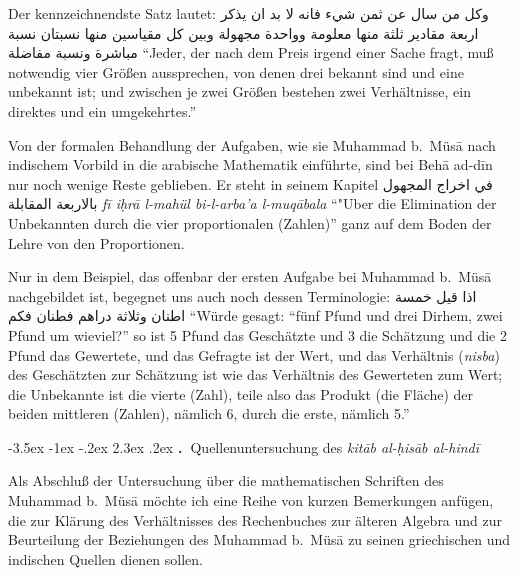 \documentclass[11pt,a4paper]{article}
\makeatletter
\newcommand{\RL}[1]{\beginR#1\endR}
\renewcommand{\section}{\@startsection{section}{1}{\z@}%
  {-3.5ex \@plus -1ex \@minus -.2ex}%
  {2.3ex \@plus .2ex}%
  {\normalfont\Large\bfseries\color{sectioncolor}\thesection.\ }}
\newcommand{\ar}[1]{{\arabicfont\RL{#1}}}
\newcommand{\enquote}[1]{``#1''}
\makeatother
\begin{document}
Der kennzeichnendste Satz lautet: \ar{وكل من سال عن ثمن شيء فانه لا بد ان يذكر اربعة مقادير ثلثة منها معلومة وواحدة مجهولة وبين كل مقياسين منها نسبتان نسبة مباشرة ونسبة مفاضلة} \enquote{Jeder, der nach dem Preis irgend einer Sache fragt, mu\ss{} notwendig vier Gr\"o\ss{}en aussprechen, von denen drei bekannt sind und eine unbekannt ist; und zwischen je zwei Gr\"o\ss{}en bestehen zwei Verh\"altnisse, ein direktes und ein umgekehrtes.}

Von der formalen Behandlung der Aufgaben, wie sie Muhammad b.\ M\"us\=a nach indischem Vorbild in die arabische Mathematik einf\"uhrte, sind bei Beh\=a{} ad-d\={i}n nur noch wenige Reste geblieben. Er steht in seinem Kapitel \ar{في اخراج المجهول بالاربعة المقابلة} \textit{f\=i{} i\d{h}r\=a l-mah\"ul bi-l-arba'a l-muq\=abala} \enquote{"Uber die Elimination der Unbekannten durch die vier proportionalen (Zahlen)} ganz auf dem Boden der Lehre von den Proportionen.

Nur in dem Beispiel, das offenbar der ersten Aufgabe bei Muhammad b.\ M\"us\=a nachgebildet ist, begegnet uns auch noch dessen Terminologie: \ar{اذا قيل خمسة اطنان وثلاثة دراهم فطنان فكم} \enquote{W\"urde gesagt: \enquote{f\"unf Pfund und drei Dirhem, zwei Pfund um wieviel?} so ist 5 Pfund das Gesch\"atzte und 3 die Sch\"atzung und die 2 Pfund das Gewertete, und das Gefragte ist der Wert, und das Verh\"altnis (\textit{nisba}) des Gesch\"atzten zur Sch\"atzung ist wie das Verh\"altnis des Gewerteten zum Wert; die Unbekannte ist die vierte (Zahl), teile also das Produkt (die Fl\"ache) der beiden mittleren (Zahlen), n\"amlich 6, durch die erste, n\"amlich 5.}

\clearpage

\section{Quellenuntersuchung des \textit{kit\=ab al-\d{h}is\=ab al-hind\=i}}

Als Abschlu\ss{} der Untersuchung \"uber die mathematischen Schriften des Muhammad b.\ M\"us\=a m\"ochte ich eine Reihe von kurzen Bemerkungen anf\"ugen, die zur Kl\"arung des Verh\"altnisses des Rechenbuches zur \"alteren Algebra und zur Beurteilung der Beziehungen des Muhammad b.\ M\"us\=a zu seinen griechischen und indischen Quellen dienen sollen.
\end{document}

